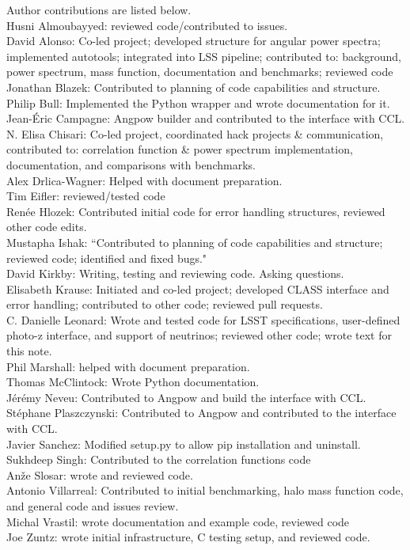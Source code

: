 Author contributions are listed below. \\
Husni Almoubayyed: reviewed code/contributed to issues. \\
David Alonso: Co-led project; developed structure for angular power spectra; implemented autotools; integrated into LSS pipeline; contributed to: background, power spectrum, mass function, documentation and benchmarks; reviewed code \\
Jonathan Blazek: Contributed to planning of code capabilities and structure. \\
Philip Bull: Implemented the Python wrapper and wrote documentation for it. \\
Jean-\'Eric Campagne: Angpow builder and contributed to the interface with CCL. \\
N. Elisa Chisari: Co-led project, coordinated hack projects \& communication, contributed to: correlation function \& power spectrum implementation, documentation, and comparisons with benchmarks. \\
Alex Drlica-Wagner: Helped with document preparation. \\
Tim Eifler: reviewed/tested code \\
Ren\'ee Hlozek: Contributed initial code for error handling structures, reviewed other code edits. \\
Mustapha Ishak: “Contributed to planning of code capabilities and structure; reviewed code; identified and fixed bugs." \\
David Kirkby: Writing, testing and reviewing code. Asking questions. \\
Elisabeth Krause: Initiated and co-led project; developed CLASS interface and error handling; contributed to other code; reviewed pull requests. \\
C. Danielle Leonard: Wrote and tested code for LSST specifications, user-defined photo-z interface, and support of neutrinos; reviewed other code; wrote text for this note. \\
Phil Marshall: helped with document preparation. \\
Thomas McClintock: Wrote Python documentation. \\
J\'er\'emy Neveu: Contributed to Angpow and build the interface with CCL. \\
St\'ephane Plaszczynski: Contributed to Angpow and contributed to the interface with CCL. \\
Javier Sanchez: Modified setup.py to allow pip installation and uninstall. \\
Sukhdeep Singh: Contributed to the correlation functions code \\
An\v{z}e Slosar: wrote and reviewed code. \\
Antonio Villarreal: Contributed to initial benchmarking, halo mass function code, and general code and issues review. \\
Michal Vrastil: wrote documentation and example code, reviewed code \\
Joe Zuntz: wrote initial infrastructure, C testing setup, and reviewed code. \\
